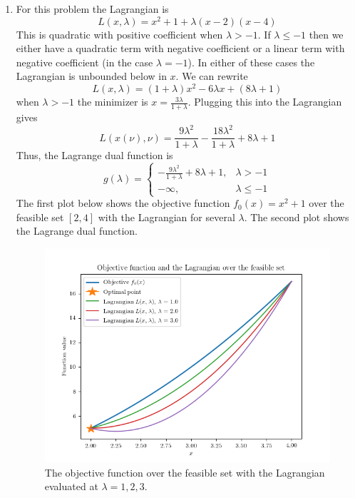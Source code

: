 \documentclass[11pt]{amsart}
\begin{document}
\begin{enumerate}
\begin{enumerate}
\item For this problem the Lagrangian is
\[
L(x,\lambda) = x^2 + 1 + \lambda(x-2)(x-4)
\]
This is quadratic with positive coefficient when $\lambda > -1$.  If $\lambda \le -1$ then we either have a quadratic term with negative coefficient or a linear term with negative coefficient (in the case $\lambda = -1$).  In either of these cases the Lagrangian is unbounded below in $x$.  We can rewrite
\[
L(x,\lambda) = (1 + \lambda)x^2 - 6 \lambda x + (8\lambda  + 1)
\]
when $\lambda > -1$ the minimizer is $x = \frac{3\lambda}{1 + \lambda}$.  Plugging this into the Lagrangian gives
\[
L(x(\nu),\nu) = \frac{9\lambda^2}{1 + \lambda} - \frac{18\lambda^2}{1 + \lambda} + 8\lambda +1 
\]
Thus, the Lagrange dual function is
\[
g(\lambda) = \begin{cases} -\frac{9\lambda^2}{1 + \lambda} + 8\lambda + 1, & \lambda > -1\\
-\infty, & \lambda \le -1
\end{cases}
\]
The first plot below shows the objective function $f_0(x) = x^2 + 1$ over the feasible set $[2,4]$ with the Lagrangian for several $\lambda$.  The second plot shows the Lagrange dual function.

\begin{figure}[H]
\centering
\includegraphics[width=5in]{fig1.png}
\caption{The objective function over the feasible set with the Lagrangian evaluated at $\lambda = 1,2,3$.}
\end{figure}


\end{enumerate}
\end{enumerate}
\end{document}
